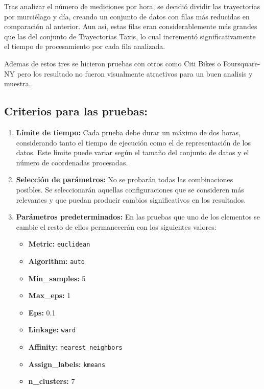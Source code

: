 Tras analizar el número de mediciones por hora, se decidió dividir las trayectorias por murciélago y día, creando un conjunto de datos con filas más reducidas en comparación al anterior. Aun así, estas filas eran considerablemente más grandes que las del conjunto de Trayectorias Taxis, lo cual incrementó significativamente el tiempo de procesamiento por cada fila analizada.

Ademas de estos tres se hicieron pruebas con otros como Citi Bikes \cite{} o Foursquare-NY \cite{} pero los resultado no fueron visualmente atractivos para un buen analisis y muestra.

\subsection{Criterios para las pruebas:}

\begin{enumerate}
    \item \textbf{Límite de tiempo:} Cada prueba debe durar un máximo de dos horas, considerando tanto el tiempo de ejecución como el de representación de los datos. Este límite puede variar según el tamaño del conjunto de datos y el número de coordenadas procesadas.
    \item \textbf{Selección de parámetros:} No se probarán todas las combinaciones posibles. Se seleccionarán aquellas configuraciones que se consideren más relevantes y que puedan producir cambios significativos en los resultados.
    \item \textbf{Parámetros predeterminados:} En las pruebas que uno de los elementos se cambie el resto de ellos permanecerán con los siguientes valores: 
    
    \begin{itemize}
    		\item \textbf{Metric:} \texttt{euclidean}
    		\item \textbf{Algorithm:} \texttt{auto}
    		\item \textbf{Min\_samples:} 5
   		\item \textbf{Max\_eps:} 1
    		\item \textbf{Eps:} 0.1
    		\item \textbf{Linkage:} \texttt{ward}
    		\item \textbf{Affinity:} \texttt{nearest\_neighbors}
    		\item \textbf{Assign\_labels:} \texttt{kmeans}
    		\item \textbf{n\_clusters:} 7
	\end{itemize}

\end{enumerate}


